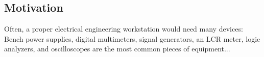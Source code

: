 \subsection{Motivation}
Often, a proper electrical engineering workstation would need many devices: Bench power supplies, digital multimeters, signal generators, an LCR meter, logic analyzers, and oscilloscopes are the most common pieces of equipment...
